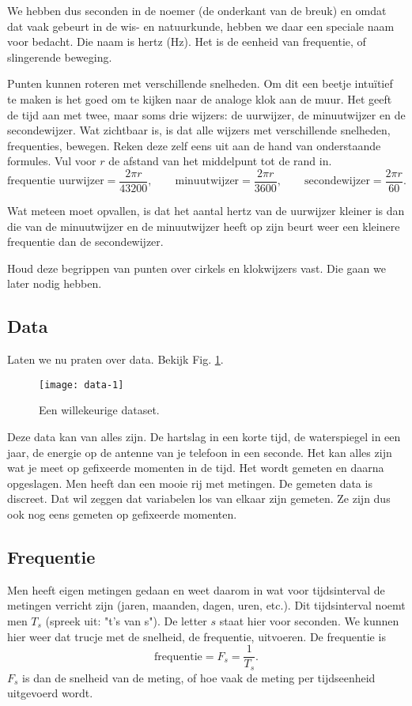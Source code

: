\documentclass[11pt,fleqn]{book} %
\begin{document}
We hebben dus seconden in de noemer (de onderkant van de breuk) en omdat dat vaak gebeurt in de wis- en natuurkunde, hebben we daar een speciale naam voor bedacht. Die naam is hertz (Hz). Het is de eenheid van frequentie, of slingerende beweging.

Punten kunnen roteren met verschillende snelheden. Om dit een beetje intuïtief te maken is het goed om te kijken naar de analoge klok aan de muur. Het geeft de tijd aan met twee, maar soms drie wijzers: de uurwijzer, de minuutwijzer en de secondewijzer. Wat zichtbaar is, is dat alle wijzers met verschillende snelheden, frequenties, bewegen. Reken deze zelf eens uit aan de hand van onderstaande formules. Vul voor $r$ de afstand van het middelpunt tot de rand in.
\begin{displaymath}
	\text{frequentie uurwijzer}=\frac{2\pi r}{43200},\qquad \text{minuutwijzer}=\frac{2\pi r}{3600},\qquad \text{secondewijzer}=\frac{2\pi r}{60}.
\end{displaymath}

Wat meteen moet opvallen, is dat het aantal hertz van de uurwijzer kleiner is dan die van de minuutwijzer en de minuutwijzer heeft op zijn beurt weer een kleinere frequentie dan de secondewijzer.

Houd deze begrippen van punten over cirkels en klokwijzers vast. Die gaan we later nodig hebben.

\subsection{Data}
Laten we nu praten over data. Bekijk Fig. \ref{fig:data-1}. 
\begin{figure}[h]
	\centering\texttt{[image: data-1]}
	\caption{Een willekeurige dataset.}
	\label{fig:data-1}
\end{figure}

Deze data kan van alles zijn. De hartslag in een korte tijd, de waterspiegel in een jaar, de energie op de antenne van je telefoon in een seconde. Het kan alles zijn wat je meet op gefixeerde momenten in de tijd. Het wordt gemeten en daarna opgeslagen. Men heeft dan een mooie rij met metingen. De gemeten data is discreet. Dat wil zeggen dat variabelen los van elkaar zijn gemeten. Ze zijn dus ook nog eens gemeten op gefixeerde momenten.

\subsection{Frequentie}
Men heeft eigen metingen gedaan en weet daarom in wat voor tijdsinterval de metingen verricht zijn (jaren, maanden, dagen, uren, etc.). Dit tijdsinterval noemt men $T_s$ (spreek uit: "t's van s"). De letter $s$ staat hier voor seconden. We kunnen hier weer dat trucje met de snelheid, de frequentie, uitvoeren. De frequentie is
\begin{displaymath}
	\text{frequentie}=F_s=\frac{1}{T_s}.
\end{displaymath}
$F_s$ is dan de snelheid van de meting, of hoe vaak de meting per tijdseenheid uitgevoerd wordt.
\end{document}
